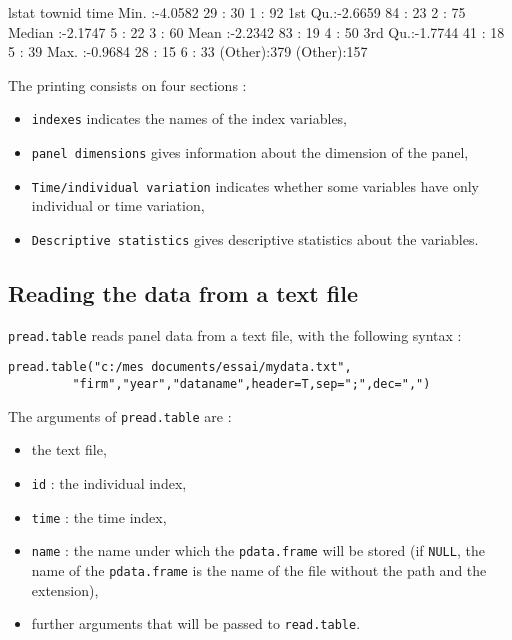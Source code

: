 \documentclass{article}
\begin{document}
\begin{Schunk}
\begin{Soutput}
     lstat             townid         time    
 Min.   :-4.0582   29     : 30   1      : 92  
 1st Qu.:-2.6659   84     : 23   2      : 75  
 Median :-2.1747   5      : 22   3      : 60  
 Mean   :-2.2342   83     : 19   4      : 50  
 3rd Qu.:-1.7744   41     : 18   5      : 39  
 Max.   :-0.9684   28     : 15   6      : 33  
                   (Other):379   (Other):157  
\end{Soutput}
\end{Schunk}

The printing consists on four sections :

\begin{itemize}
\item \texttt{indexes} indicates the names of the index variables,
\item \texttt{panel dimensions} gives information about the dimension
  of the panel,
\item \texttt{Time/individual variation} indicates whether some
  variables have only individual or time variation,
\item \texttt{Descriptive statistics} gives descriptive statistics
  about the variables.
\end{itemize}

\subsection{Reading the data from a text file}

\texttt{pread.table} reads panel data from a text file, with the
following syntax : 

\begin{verbatim}
pread.table("c:/mes documents/essai/mydata.txt",
         "firm","year","dataname",header=T,sep=";",dec=",")
\end{verbatim}

The arguments of  \texttt{pread.table} are :

\begin{itemize}
\item the text file,
\item \texttt{id} : the individual index,
\item \texttt{time} : the time index,
\item \texttt{name} : the name under which the  \texttt{pdata.frame}
  will be stored  (if \texttt{NULL}, the name of the \texttt{pdata.frame}
  is the name of the file without the path and the extension),
\item further arguments that will be passed to  \texttt{read.table}.
\end{itemize}
\end{document}

